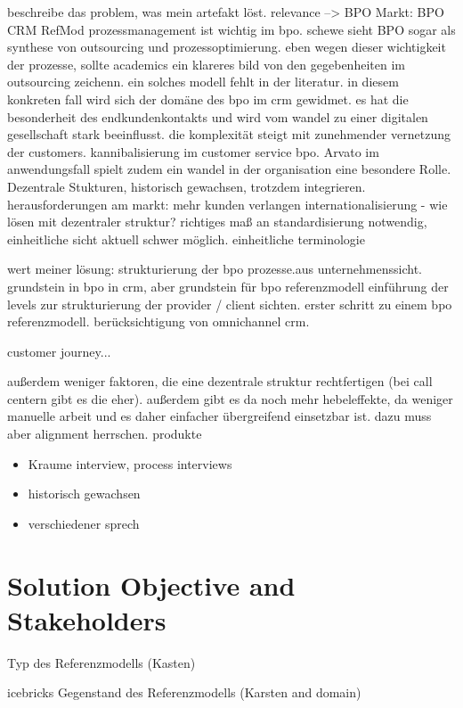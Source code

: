 beschreibe das problem, was mein artefakt löst. 
relevance --> BPO Markt: 
BPO CRM RefMod
prozessmanagement ist wichtig im bpo. schewe sieht BPO sogar als synthese von outsourcing und prozessoptimierung. eben wegen dieser wichtigkeit der prozesse, sollte academics ein klareres bild von den gegebenheiten im outsourcing zeichenn. ein solches modell fehlt in der literatur. in diesem konkreten fall wird sich der domäne des bpo im crm gewidmet. es hat die besonderheit des endkundenkontakts und wird vom wandel zu einer digitalen gesellschaft stark beeinflusst. die komplexität steigt mit zunehmender vernetzung der customers. kannibalisierung im customer service bpo. 
Arvato
im anwendungsfall spielt zudem ein wandel in der organisation eine besondere Rolle. Dezentrale Stukturen, historisch gewachsen, trotzdem integrieren. herausforderungen am markt: mehr kunden verlangen internationalisierung - wie lösen mit dezentraler struktur? richtiges maß an standardisierung notwendig, einheitliche sicht aktuell schwer möglich. einheitliche terminologie

wert meiner lösung:
strukturierung der bpo prozesse.aus unternehmenssicht. grundstein in bpo in crm, aber grundstein für bpo referenzmodell  
einführung der levels zur strukturierung der provider / client sichten. erster schritt zu einem bpo referenzmodell. 
berücksichtigung von omnichannel crm. 

customer journey...

außerdem weniger faktoren, die eine dezentrale struktur rechtfertigen (bei call centern gibt es die eher). außerdem gibt es da noch mehr hebeleffekte, da weniger manuelle arbeit und es daher einfacher übergreifend einsetzbar ist. dazu muss aber alignment herrschen. produkte 
\begin{itemize}
	\item Kraume interview, process interviews
	\item historisch gewachsen
	\item verschiedener sprech
	
\end{itemize}
\section{Solution Objective and Stakeholders}
Typ des Referenzmodells (Kasten)

icebricks 
Gegenstand des Referenzmodells (Karsten and domain)

